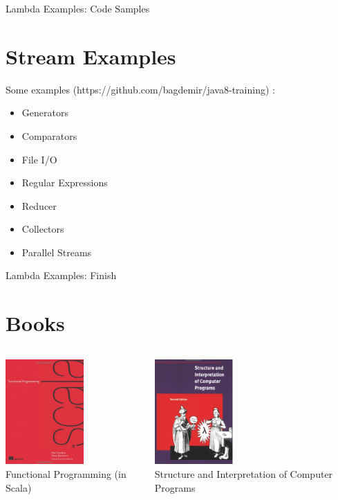 \documentclass{beamer}
\begin{document}
	\begin{frame}[fragile]{Lambda Examples: Code Samples}
		\section{Stream Examples}

		Some examples (https://github.com/bagdemir/java8-training) : 
		\begin{itemize}
			\item Generators
			\item Comparators
			\item File I/O
			\item Regular Expressions
			\item Reducer
			\item Collectors
			\item Parallel Streams
		\end{itemize}		
	\end{frame}	
	
	\begin{frame}[fragile]{Lambda Examples: Finish}
		\section{Books}

	\begin{columns}
    	\begin{column}{0.5\textwidth}
			\vspace{0pt}
			\centering
			\includegraphics[width=3cm]{scalabook} \\
			Functional Programming (in Scala)\\
			
    	\end{column}
    	\begin{column}{0.5\textwidth}
			\vspace{0pt}
			\includegraphics[width=3cm]{lambdabook}	\\
			Structure and Interpretation of Computer Programs
	  		\end{column}
	\end{columns}
	\end{frame}	
			
\end{document}
